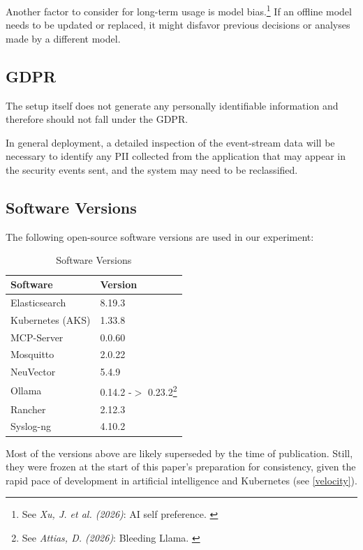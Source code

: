 Another factor to consider for long-term usage is model bias.\footnote{See \textit{Xu, J. et al. (2026)}: AI self preference. \cite{xu2026}} If an offline model needs to be updated or replaced, it might disfavor previous decisions or analyses made by a different model.

\subsection{GDPR}

The setup itself does not generate any personally identifiable information and therefore should not fall under the GDPR. 

In general deployment, a detailed inspection of the event-stream data will be necessary to identify any PII collected from the application that may appear in the security events sent, and the system may need to be reclassified.

\subsection{Software Versions}

The following open-source software versions are used in our experiment:

\begin{table}[ht]
  \caption{Software Versions}
    \begin{tabular}{| l | l |}
    \hline
    Software & Version \\
    \hline\hline
    Elasticsearch & 8.19.3 \\
    \hline
    Kubernetes (AKS) & 1.33.8 \\
    \hline
    MCP-Server & 0.0.60 \\
    \hline
    Mosquitto & 2.0.22 \\
    \hline
    NeuVector & 5.4.9 \\
    \hline
    Ollama & 0.14.2 -$>$ 0.23.2\footnote{See \textit{Attias, D. (2026)}: Bleeding Llama. \cite{bleedingLlama}} \\
    \hline
    Rancher & 2.12.3 \\
    \hline
    Syslog-ng & 4.10.2 \\
    \hline
    \end{tabular}%
  \label{tab:aksBenchmark}%
\end{table}%

Most of the versions above are likely superseded by the time of publication. Still, they were frozen at the start of this paper's preparation for consistency, given the rapid pace of development in artificial intelligence and Kubernetes (see \ref{velocity}).
